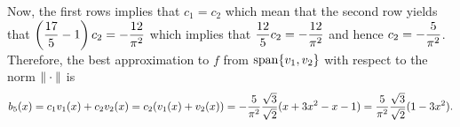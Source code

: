\begin{solution}
\begin{enumerate}
\[\]
Now, the first rows implies that $c_1=c_2$ which mean that the second row yields that $\displaystyle{\left({17 \over 5}-1\right)c_2=-{12 \over \pi^2}}$ which implies that $\displaystyle{{12 \over 5}c_2=-{12 \over \pi^2}}$ and hence $\displaystyle{c_2=-{5 \over \pi^2}}$. Therefore, the best approximation to $f$ from ${\rm span}\{v_1,v_2\}$ with respect to the norm $\|\cdot\|$ is
\[
b_5(x)=c_1v_1(x)+c_2v_2(x)=c_2(v_1(x)+v_2(x))=-{5 \over \pi^2}{\sqrt{3} \over \sqrt{2}}(x+3x^2-x-1)={5 \over \pi^2}{\sqrt{3} \over \sqrt{2}}(1-3x^2).
\]
\end{enumerate}
\end{solution}